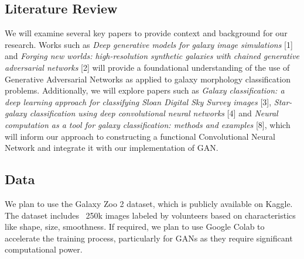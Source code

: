 \subsection{Literature Review}

We will examine several key papers to provide context and background for our research. 
Works such as \textit{Deep generative models for galaxy image simulations} [1] and 
\textit{Forging new worlds: high-resolution synthetic galaxies with chained generative adversarial networks} [2] 
will provide a foundational understanding of the use of Generative Adversarial Networks as applied to galaxy morphology classification problems. 
Additionally, we will explore papers such as \textit{Galaxy classification: a deep learning approach for classifying Sloan Digital Sky Survey images} [3], 
\textit{Star-galaxy classification using deep convolutional neural networks} [4]
and \textit{Neural computation as a tool for galaxy classification: methods and examples} [8], 
which will inform our approach to constructing a functional Convolutional Neural Network and integrate it with our implementation of GAN.

\subsection{Data}
We plan to use the Galaxy Zoo 2 dataset, which is publicly available on Kaggle. 
The dataset includes ~250k images labeled by volunteers based on characteristics like shape, size, smoothness. 
If required, we plan to use Google Colab to accelerate the training process, particularly for GANs as they require significant computational power.


